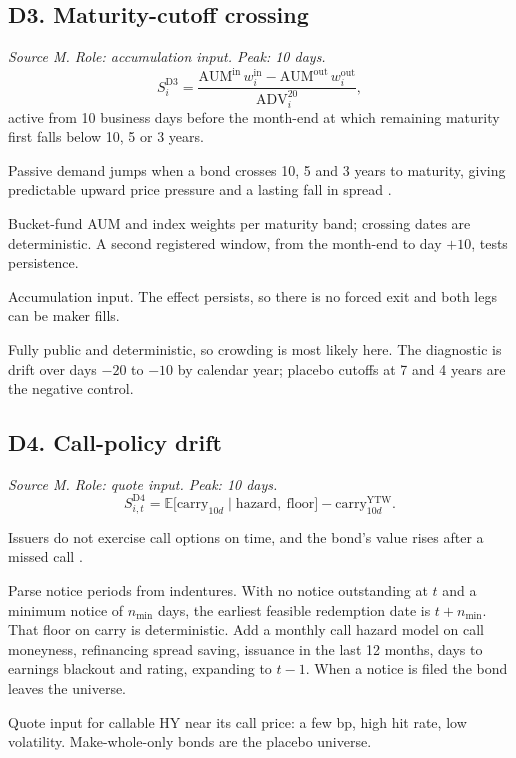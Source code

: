 \documentclass[11pt,letterpaper]{article}
\newcommand{\E}{\mathbb{E}}
\newcommand{\ADV}{\mathrm{ADV}}
\begin{document}
\subsection{D3. Maturity-cutoff crossing}
\emph{Source M. Role: accumulation input. Peak: 10 days.}
\begin{equation}
S^{\mathrm{D3}}_{i}=\frac{\mathrm{AUM}^{\mathrm{in}}\,w^{\mathrm{in}}_i-\mathrm{AUM}^{\mathrm{out}}\,w^{\mathrm{out}}_i}{\ADV^{20}_i},
\end{equation}
active from 10 business days before the month-end at which remaining maturity first falls below 10, 5 or 3 years.
\begin{spec}
\item[Mechanism and evidence.] Passive demand jumps when a bond crosses 10, 5 and 3 years to maturity, giving predictable upward price pressure and a lasting fall in spread \cite{bsy}.
\item[Build.] Bucket-fund AUM and index weights per maturity band; crossing dates are deterministic. A second registered window, from the month-end to day $+10$, tests persistence.
\item[Role in the quote.] Accumulation input. The effect persists, so there is no forced exit and both legs can be maker fills.
\item[Decay and pitfalls.] Fully public and deterministic, so crowding is most likely here. The diagnostic is drift over days $-20$ to $-10$ by calendar year; placebo cutoffs at 7 and 4 years are the negative control.
\end{spec}

\subsection{D4. Call-policy drift}
\emph{Source M. Role: quote input. Peak: 10 days.}
\begin{equation}
S^{\mathrm{D4}}_{i,t}=\E\bigl[\mathrm{carry}_{10d}\mid\text{hazard},\ \text{floor}\bigr]-\mathrm{carry}^{\mathrm{YTW}}_{10d}.
\end{equation}
\begin{spec}
\item[Mechanism and evidence.] Issuers do not exercise call options on time, and the bond's value rises after a missed call \cite{ir2025}.
\item[Build.] Parse notice periods from indentures. With no notice outstanding at $t$ and a minimum notice of $n_{\min}$ days, the earliest feasible redemption date is $t+n_{\min}$. That floor on carry is deterministic. Add a monthly call hazard model on call moneyness, refinancing spread saving, issuance in the last 12 months, days to earnings blackout and rating, expanding to $t-1$. When a notice is filed the bond leaves the universe.
\item[Role in the quote.] Quote input for callable HY near its call price: a few bp, high hit rate, low volatility. Make-whole-only bonds are the placebo universe.
\end{spec}
\end{document}

